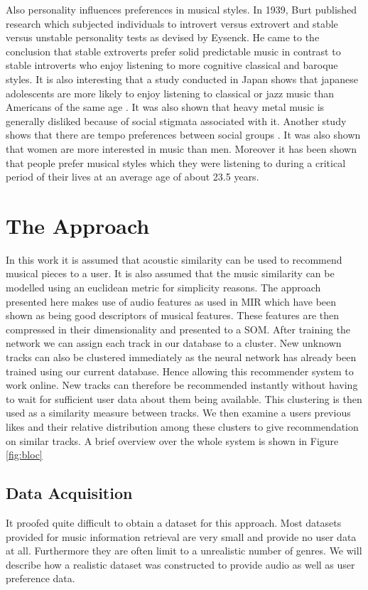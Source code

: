 \documentclass[cic,tc,english]{iiufrgs}
\begin{document}
Also personality influences preferences in musical styles. In 1939, Burt published research which subjected individuals to introvert versus extrovert and stable versus unstable personality tests as devised by Eysenck. He came to the conclusion that stable extroverts prefer solid predictable music in contrast to stable introverts who enjoy listening to more cognitive classical and baroque styles. It is also interesting that a study conducted in Japan shows that japanese adolescents are more likely to enjoy listening to classical or jazz music than Americans of the same age \cite{wells1998genre}. It was also shown that heavy metal music is generally disliked because of social stigmata associated with it. Another study shows that there are tempo preferences between social groups \cite{uitdenbogerd2002review}. It was also shown that women are more interested in music than men. Moreover it has been shown that people prefer musical styles which they were listening to during a critical period of their lives at an average age of about 23.5 years.  

\chapter{The Approach}
In this work it is assumed that acoustic similarity can be used to recommend musical pieces to a user. It is also assumed that the music similarity can be modelled using an euclidean metric for simplicity reasons. The approach presented here makes use of audio features as used in MIR which have been shown as being good descriptors of musical features. These features are then compressed in their dimensionality and presented to a SOM. After training the network we can assign each track in our database to a cluster. New unknown tracks can also be clustered immediately as the neural network has already been trained using our current database. Hence allowing this recommender system to work online. New tracks can therefore be recommended instantly without having to wait for sufficient user data about them being available. This clustering is then used as a similarity measure between tracks. We then examine a users previous likes and their relative distribution among these clusters to give recommendation on similar tracks. A brief overview over the whole system is shown in Figure \ref{fig:bloc}

\section{Data Acquisition}
It proofed quite difficult to obtain a dataset for this approach. Most datasets provided for music information retrieval are very small and provide no user data at all. Furthermore they are often limit to a unrealistic number of genres. We will describe how a realistic dataset was constructed to provide audio as well as user preference data.
\end{document}
